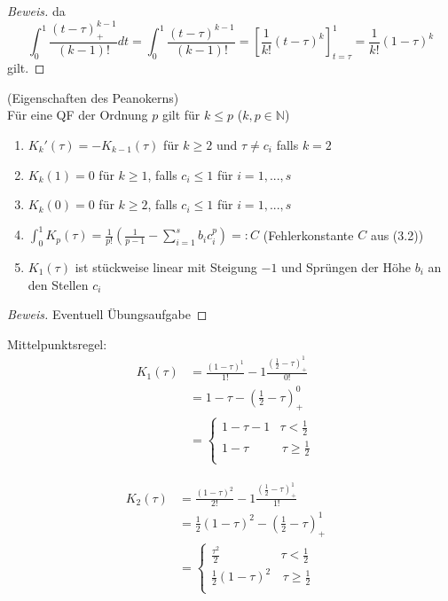 \begin{nothing}
\begin{description}
\begin{proof}[Beweis]
    da
    \begin{displaymath}
    \int_0^1 \frac{(t-\tau)^{k-1}_+}{(k-1)!} dt
    = \int_0^1 \frac{(t-\tau)^{k-1}}{(k-1)!}
    = \left[ \frac{1}{k!} (t-\tau)^k \right]_{t=\tau}^1
    = \frac{1}{k!} (1-\tau)^k
    \end{displaymath}
    gilt.
    \end{proof}
    
  \item[Satz 2:] (Eigenschaften des Peanokerns) \\
    Für eine QF der Ordnung $p$ gilt für $k \leq p$ ($k, p \in \mathbb{N}$) 
    \begin{enumerate}
      \item $K_k'(\tau) = -K_{k-1}(\tau)$ für $k \geq 2$ und $\tau \neq c_i$ falls $k=2$
      \item $K_k(1) = 0$ für $k \geq 1$, falls $c_i \leq 1$ für $i=1,..., s$
      \item $K_k(0) = 0$ für $k \geq 2$, falls $c_i \leq 1$ für $i=1,..., s$
      \item $\int_0^1 K_p(\tau) = \frac{1}{p!} \left(\frac{1}{p-1} - \sum_{i=1}^s b_i c_i^p \right)=: C$ (Fehlerkonstante $C$ aus (3.2))
      \item $K_1(\tau)$ ist stückweise linear mit Steigung $-1$ und Sprüngen der Höhe $b_i$ an den Stellen $c_i$
    \end{enumerate}
  
  \item
  \begin{proof}[Beweis]
    Eventuell Übungsaufgabe
  \end{proof}
  
  \item[Beispiel:] 
    Mittelpunktsregel: 
      \begin{align*}
      K_1(\tau) &= \frac{(1-\tau)^1}{1!} - 1 \frac{(\frac{1}{2} - \tau)^1_+}{0!} &\\
      &= 1- \tau - \left( \frac{1}{2} - \tau \right)_+^0&\\
      &= \left\{
        \begin{array}{ll}
        1-\tau - 1  & \tau < \frac{1}{2} \\
        1-\tau & \, \tau \geq \frac{1}{2} \\
        \end{array}
      \right.
      \end{align*}
      
      \begin{align*}
      K_2(\tau) &= \frac{(1-\tau)^2}{2!} - 1 \frac{(\frac{1}{2} - \tau)^1_+}{1!}&\\
      &= \frac{1}{2} (1-\tau)^2 - \left( \frac{1}{2} - \tau \right)_+^1&\\
      &= \left\{
        \begin{array}{ll}
        \frac{\tau^2}{2}  & \tau < \frac{1}{2} \\
        \frac{1}{2}(1-\tau)^2 & \, \tau \geq \frac{1}{2} \\
        \end{array}
      \right.
      \end{align*}
    

\end{description}
\end{nothing}
